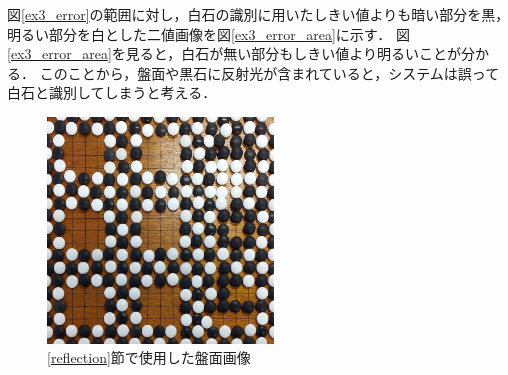 \documentclass[summary]{nitocs}
\numberwithin{equation}{section}
\begin{document}
            図\ref{ex3_error}の範囲に対し，白石の識別に用いたしきい値よりも暗い部分を黒，明るい部分を白とした二値画像を図\ref{ex3_error_area}に示す．
            図\ref{ex3_error_area}を見ると，白石が無い部分もしきい値より明るいことが分かる．
            このことから，盤面や黒石に反射光が含まれていると，システムは誤って白石と識別してしまうと考える．
            \begin{figure}[tb] %
                \begin{center}
                \includegraphics[clip,width=60mm]{DSC_0098/boardImg.jpg} 
                \caption{\ref{reflection}節で使用した盤面画像}
                \label{ex3}
                \end{center}
            \end{figure}
\end{document}
